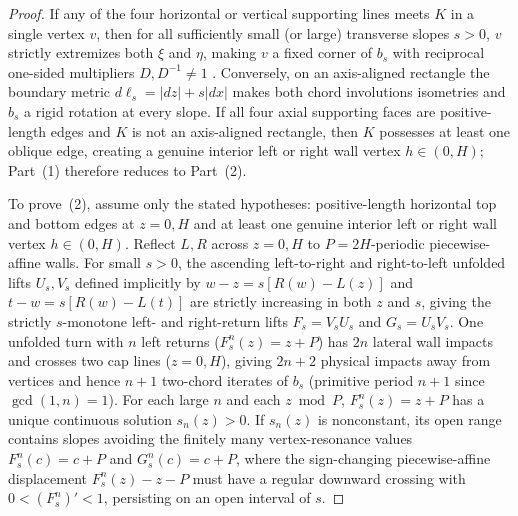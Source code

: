 \documentclass[11pt,reqno]{amsart}
\theoremstyle{definition}
\theoremstyle{remark}
\begin{document}
\begin{proof}
If any of the four horizontal or vertical supporting lines meets $K$ in a single vertex $v$, then for all sufficiently small (or large) transverse slopes $s > 0$, $v$ strictly extremizes both $\xi$ and $\eta$, making $v$ a fixed corner of $b_s$ with reciprocal one-sided multipliers $D, D^{-1} \ne 1$ \cite[Prop.~5]{NogueiraTroubetzkoy2020}. Conversely, on an axis-aligned rectangle the boundary metric $d\ell_s = |dz| + s|dx|$ makes both chord involutions isometries and $b_s$ a rigid rotation at every slope. If all four axial supporting faces are positive-length edges and $K$ is not an axis-aligned rectangle, then $K$ possesses at least one oblique edge, creating a genuine interior left or right wall vertex $h \in (0, H)$; Part~(1) therefore reduces to Part~(2).

To prove~(2), assume only the stated hypotheses: positive-length horizontal top and bottom edges at $z = 0, H$ and at least one genuine interior left or right wall vertex $h \in (0, H)$. Reflect $L, R$ across $z = 0, H$ to $P = 2H$-periodic piecewise-affine walls. For small $s > 0$, the ascending left-to-right and right-to-left unfolded lifts $U_s, V_s$ defined implicitly by $w - z = s[R(w) - L(z)]$ and $t - w = s[R(w) - L(t)]$ are strictly increasing in both $z$ and $s$, giving the strictly $s$-monotone left- and right-return lifts $F_s = V_s U_s$ and $G_s = U_s V_s$. One unfolded turn with $n$ left returns ($F_s^n(z) = z + P$) has $2n$ lateral wall impacts and crosses two cap lines ($z = 0, H$), giving $2n + 2$ physical impacts away from vertices and hence $n + 1$ two-chord iterates of $b_s$ (primitive period $n + 1$ since $\gcd(1, n) = 1$). For each large $n$ and each $z \bmod P$, $F_s^n(z) = z + P$ has a unique continuous solution $s_n(z) > 0$. If $s_n(z)$ is nonconstant, its open range contains slopes avoiding the finitely many vertex-resonance values $F_s^n(c) = c + P$ and $G_s^n(c) = c + P$, where the sign-changing piecewise-affine displacement $F_s^n(z) - z - P$ must have a regular downward crossing with $0 < (F_s^n)' < 1$, persisting on an open interval of $s$.


\end{proof}
\end{document}
